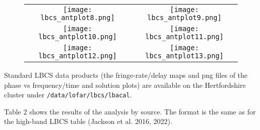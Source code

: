 \documentclass[12pt]{article}
\begin{document}
\begin{figure}
  \begin{tabular}{cc}
    \texttt{[image: lbcs\_antplot8.png]}&
    \texttt{[image: lbcs\_antplot9.png]}\\
    \texttt{[image: lbcs\_antplot10.png]}&
    \texttt{[image: lbcs\_antplot11.png]}\\
    \texttt{[image: lbcs\_antplot12.png]}&
    \texttt{[image: lbcs\_antplot13.png]}\\
  \end{tabular}
  \end{figure}


Standard LBCS data products (the fringe-rate/delay maps and png files of the phase vs frequency/time and solution plots) are available on the Hertfordshire cluster under {\tt /data/lofar/lbcs/lbacal}.

Table 2 shows the results of the analysis by source. The format is the same as for the high-band LBCS table (Jackson et al. 2016, 2022).

\clearpage
\scriptsize
\end{document}
